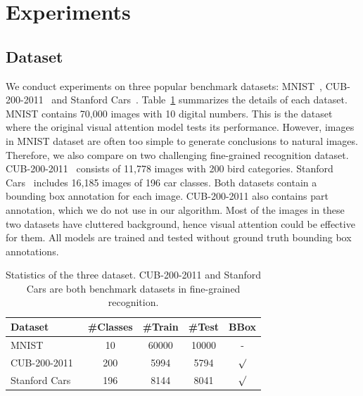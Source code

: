 \documentclass[10pt,twocolumn,letterpaper]{article}
\begin{document}
\section{Experiments}

\subsection{Dataset}

We conduct experiments on three popular benchmark datasets: MNIST~\cite{lecun1998gradient}, CUB-200-2011~\cite{wah2011caltech} and Stanford Cars~\cite{krause20133d}.
Table~\ref{tab:dataset} summarizes the details of each dataset.
MNIST contains 70,000 images with 10 digital numbers.
This is the dataset where the original visual attention model tests its performance.
However, images in MNIST dataset are often too simple to generate conclusions to natural images.
Therefore, we also compare on two challenging fine-grained recognition dataset.
CUB-200-2011~\cite{wah2011caltech} consists of 11,778 images with 200 bird categories.
Stanford Cars~\cite{krause20133d} includes 16,185 images of 196 car classes.
Both datasets contain a bounding box annotation for each image.
CUB-200-2011 also contains part annotation, which we do not use in our algorithm.
Most of the images in these two datasets have cluttered background, hence visual attention could be effective for them.
All models are trained and tested without ground truth bounding box annotations.

\begin{table}
  \centering
  \addtolength{\tabcolsep}{2.5pt}
    \begin{tabular}{l c c c c}
      \toprule[0.2 em]
      Dataset & \#Classes & \#Train & \#Test & BBox  \\
      \toprule[0.2 em]
      \midrule
      MNIST~\cite{lecun1998gradient} & 10 & 60000 & 10000 & - \\
      CUB-200-2011~\cite{wah2011caltech} & 200 & 5994 & 5794 & $\surd$ \\
      Stanford Cars~\cite{krause20133d} & 196 & 8144 & 8041 & $\surd$ \\
      \bottomrule[0.1 em]
    \end{tabular}
    \vspace{1pt}
    \caption{Statistics of the three dataset. CUB-200-2011 and Stanford Cars are both benchmark datasets in fine-grained recognition.}
    \label{tab:dataset}
\end{table}
\end{document}
